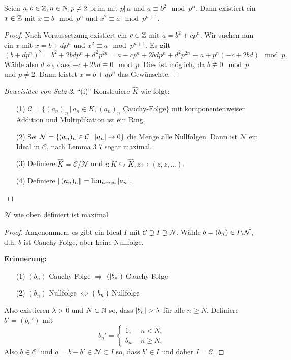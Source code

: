 \begin{Lem}
Seien $a,b \in\mathbb{Z}, n\in\mathbb{N},p\neq 2$ prim mit $p\not |\, a$ und $a\equiv b^2\mod p^n$.
Dann existiert ein $x\in\mathbb{Z}$ mit $x\equiv b\mod p^n$ und $x^2\equiv a\mod p^{n+1}$.
\end{Lem}

\begin{proof}
Nach Voraussetzung existiert ein $c\in\mathbb{Z}$ mit $a=b^2+cp^n$.
Wir suchen nun ein $x$ mit $x =b+dp^n$ und $x^2\equiv a\mod p^{n+1}$. Es gilt
\[ (b+dp^n)^2
= b^2+2bdp^n +d^2p^{2n}
= a-cp^n + 2bdp^n +d^2 p^{2n}
\equiv a+p^n (-c+2bd) \mod p.
\]
Wähle also $d$ so, dass $-c+2bd \equiv 0 \mod p$. Dies ist möglich, da $b\not\equiv 0 \mod p$ und $p\neq 2$. Dann leistet $x=b+dp^n$ das Gewünschte.
\end{proof}


\begin{proof}[Beweisidee von Satz 2]
\enquote{(i)} Konstruiere $\hat{K}$ wie folgt:
\begin{itemize}
\item[(1)] $\mathcal{C} = \{ (a_n)_n \, | \, a_n \in K, (a_n)_n \text{ Cauchy-Folge}\}$ mit komponentenweiser Addition und Multiplikation ist ein Ring.
\item[(2)] Sei $\mathcal{N} = \{ (a_n)_n \in \mathcal{C} \,|\, \left|{a_n}\right| \to 0 \}$
			die Menge alle Nullfolgen. Dann ist $\mathcal{N}$ ein Ideal in $\mathcal{C}$, nach Lemma 3.7 sogar maximal.
\item[(3)] Definiere $\hat{K} = \mathcal{C} / \mathcal{N}$ und $i \colon K \hookrightarrow \hat{K}, z \mapsto (z,z,\dots)$.
\item[(4)] Definiere $\left\|{(a_n)_n}\right\| = \lim_{n\to\infty} \left|{a_n}\right|$.
\end{itemize}
\end{proof}


\begin{Lem}
$\mathcal{N}$ wie oben definiert ist maximal.
\end{Lem}


\begin{proof}
Angenommen, es gibt ein Ideal $I$ mit $\mathcal{C} \supsetneq I \supsetneq \mathcal{N}$. Wähle 
$b=(b_n) \in I \backslash \mathcal{N}$, d.h. $b$ ist Cauchy-Folge, aber keine Nullfolge.

\bigskip
\textbf{Erinnerung:}
\begin{itemize}
\item[(1)] $(b_n)$ Cauchy-Folge $\Rightarrow$ $(\left|{b_n}\right|)$ Cauchy-Folge
\item[(2)] $(b_n)$ Nullfolge $\Leftrightarrow$ $(\left|{b_n}\right|)$ Nullfolge
\end{itemize}

Also existieren $\lambda>0$ und $N\in\mathbb{N}$ so, dass $\abs{b_n}> \lambda$ für alle $n\geq N$.
Definiere $b'= (b_n')$ mit 
\[ b_n' = \begin{cases}
1, &\mbox{} n<N, \\
b_n, &\mbox{} n \geq N.
\end{cases}
\]
Also $b \in \mathcal{C}^\times $und $a= b-b' \in \mathcal{N}\subset I$ so, dass $b' \in I$ und daher $I=\mathcal{C}$.
\end{proof}





